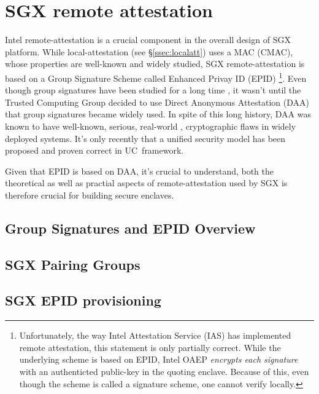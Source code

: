 \documentclass[10pt]{article}
\newcommand{\secref}[1]{\S\ref{#1}}
\newcommand{\uc}{\textsf{UC}}
\begin{document}
  \section{SGX remote attestation}
  \label{sec:remoteatt}
  Intel remote-attestation is a crucial component in the overall 
  design of SGX platform. While local-attestation (see 
  \secref{ssec:localatt}) uses a MAC (CMAC), whose properties are 
  well-known and widely studied, SGX remote-attestation is based on a 
  Group Signature Scheme \cite{ChaumGroupSignatures} called Enhanced Privay
  ID (EPID) \cite{epid} \footnote{Unfortunately, the way Intel Attestation
  Service (IAS) has implemented remote attestation, this statement is 
  only partially correct. While the underlying scheme is based on EPID, Intel 
  OAEP \textit{encrypts each signature} with an authenticted public-key in the quoting enclave. 
  Because of this, even though the scheme is called a signature scheme, one cannot
  verify locally.}. Even though group signatures have been 
  studied for a long time \cite{camenischLysyankaya, coalitionresistant, 
  BMW03, dynamicGroupSignatures}, it wasn't until the Trusted Computing 
  Group decided to use Direct Anonymous Attestation (DAA) \cite{daa} that group 
  signatures became widely used. In spite of this long history, DAA was 
  known to have well-known, serious, real-world \cite{tpmDHOracle}, cryptographic 
  flaws \cite{daaproblems} in widely deployed systems. It's only recently 
  that a unified security model has been proposed \cite{ucdaa} and proven 
  correct in \uc\ framework.

  Given that EPID is based on DAA, it's crucial to understand, both the 
  theoretical as well as practial aspects of remote-attestation used by SGX is 
  therefore crucial for building secure enclaves.

  \subsection{Group Signatures and EPID Overview}
  \label{ssec:epid}
  \cite{bbs}
  \cite{bbsplus}
  \cite{concurrentJoinGroupSignatures}



  \subsection{SGX Pairing Groups}
  \label{ssec:pairings}

  \subsection{SGX EPID provisioning}
  \label{ssec:epidprov}
\end{document}
